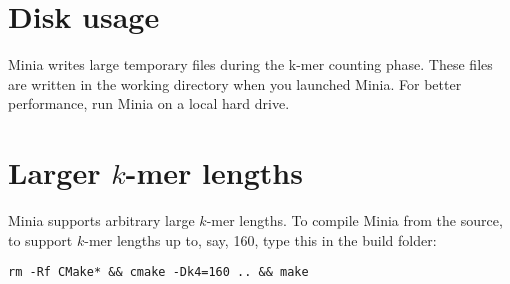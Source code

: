 \documentclass[a4paper]{article}
\begin{document}
\section{Disk usage}

Minia writes large temporary files during the k-mer counting phase. These files are written in the working directory when you launched Minia. For better performance, run Minia on a local hard drive. 

\section{Larger $k$-mer lengths}

Minia supports arbitrary large $k$-mer lengths. To compile Minia from the source, to support $k$-mer lengths up to, say, 160, type this in the build folder:
\begin{verbatim}
rm -Rf CMake* && cmake -Dk4=160 .. && make
\end{verbatim}
\end{document}
